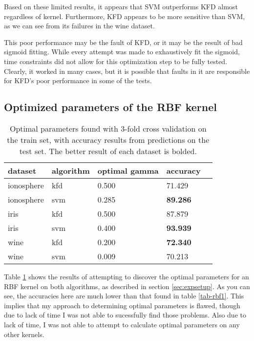 \documentclass[12pt]{article}
\begin{document}
Based on these limited results, it appears that SVM outperforms KFD almost regardless of kernel.  Furthermore, KFD appears to be more sensitive than SVM, as we can see from its failures in the wine dataset.

This poor performance may be the fault of KFD, or it may be the result of bad sigmoid fitting.  While every attempt was made to exhaustively fit the sigmoid, time constraints did not allow for this optimization step to be fully tested.  Clearly, it worked in many cases, but it is possible that faults in it are responsible for KFD's poor performance in some of the tests.

\subsection{Optimized parameters of the RBF kernel}

\begin{table}[ht]
\begin{tabular}{l || p{2cm} | p{2cm} | p{2cm} |  p{2cm}}
dataset & algorithm & optimal gamma & accuracy \\
\hline
\hline
ionosphere & kfd & 0.500 & 71.429 \\ 
ionosphere & svm & 0.285 & \textbf{89.286} \\ 
\hline
iris & kfd & 0.500 & 87.879 \\ 
iris & svm & 0.400 & \textbf{93.939} \\ 
\hline
wine & kfd & 0.200 & \textbf{72.340} \\ 
wine & svm & 0.009 & 70.213 \\ 
\end{tabular}
\caption{Optimal parameters found with 3-fold cross validation on the train set, with accuracy results from predictions on the test set.  The better result of each dataset is bolded.}
\label{tab-optrbf}
\end{table}

Table \ref{tab-optrbf} shows the results of attempting to discover the optimal parameters for an RBF kernel on both algorithms, as described in section \ref{sec:expsetup}. As you can see, the accuracies here are much lower than that found in table \ref{tab-rbf1}.  This implies that my approach to determining optimal parameters is flawed, though due to lack of time I was not able to sucessfully find those problems.  Also due to lack of time, I was not able to attempt to calculate optimal parameters on any other kernels.
\end{document}

